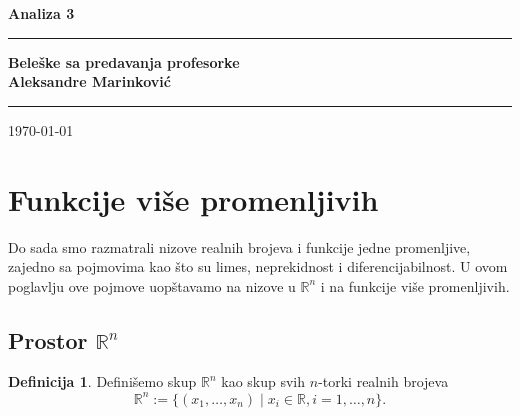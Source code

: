 \documentclass[11pt]{article}
\theoremstyle{definition}
\newtheorem{definicija}{Definicija}[section]
\theoremstyle{serbnodot}
\begin{document}
\begin{titlepage}
    \centering
    \vspace*{3cm}

    {\Huge \textbf{Analiza 3}}

    \vspace{1cm}

    \rule{\textwidth}{1.2pt}

    \vspace{0.6cm}
    {\Huge \textbf{Beleške sa predavanja profesorke}}\\[0.3cm]
    {\Huge \textbf{Aleksandre Marinković}}
    \vspace{0.6cm}

    \rule{\textwidth}{1.2pt}

    \vfill

    {\large \today}

\end{titlepage}

\newpage
\tableofcontents 
\newpage

\section{Funkcije više promenljivih}
Do sada smo razmatrali nizove realnih brojeva i funkcije jedne promenljive,
zajedno sa pojmovima kao što su limes, neprekidnost i diferencijabilnost.
U ovom poglavlju ove pojmove uopštavamo na nizove u \( \mathbb{R}^n \)
i na funkcije više promenljivih.

\subsection{Prostor \( \mathbb{R}^n \)}

\begin{definicija}

    Definišemo skup \( \mathbb{R}^n \) kao skup svih \(n\)-torki realnih brojeva
    \[
        \mathbb{R}^n := \{(x_1, \dots , x_n) \mid x_i \in \mathbb{R}, i = 1, \dots , n \}.
    \]

\end{definicija}
\end{document}
